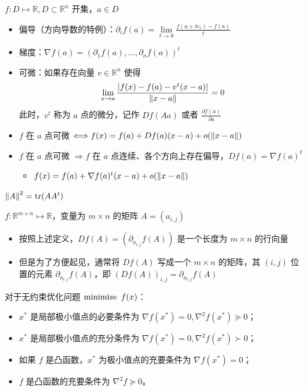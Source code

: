 \begin{remark}
    $f: D \mapsto \mathbb{R}, D \subset \mathbb{R}^n$ 开集，$a \in D$\begin{itemize}
        \item 偏导（方向导数的特例）：$\partial_if(a) = \underset{t \to 0}{\lim}\frac{f(a + te_i) - f(a)}{t}$
        \item 梯度：$\nabla f(a) = (\partial_1f(a), \dots, \partial_nf(a))^t$
        \item 可微：如果存在向量 $v \in \mathbb{R}^n$ 使得\[\lim_{x \to a}\frac{|f(x) - f(a) - v^t(x - a)|}{\norm{x - a}} = 0\]此时，$v^t$ 称为 $a$ 点的微分，记作 $Df(Aa)$ 或者 $\frac{\partial f(a)}{\partial a}$
        \item $f$ 在 $a$ 点可微 $\Longleftrightarrow f(x) = f(a) + Df(a)(x - a) + o(\norm{x - a})$
        \item $f$ 在 $a$ 点可微 $\Longrightarrow f$ 在 $a$ 点连续、各个方向上存在偏导，$Df(a) = \nabla f(a)^t$\begin{itemize}
            \item $f(x) = f(a) + \nabla f(a)^t(x - a) + o(\norm{x - a})$
        \end{itemize} 
    \end{itemize}
\end{remark}

\begin{remark}
	$\norm{A}^2 = \tr(AA^t)$
\end{remark}

\begin{remark}
    $f: \mathbb{R}^{m \times n} \mapsto \mathbb{R}$，变量为 $m \times n$ 的矩阵 $A = (a_{i, j})$\begin{itemize}
        \item 按照上述定义，$Df(A) = (\partial_{a_{i, j}}f(A))$ 是一个长度为 $m \times n$ 的行向量
        \item 但是为了方便起见，通常将 $Df(A)$ 写成一个 $m \times n$ 的矩阵，其 $(i, j)$ 位置的元素 $\partial_{a_{i, j}}f(A)$，即 $(Df(A))_{i, j} = \partial_{a_{i, j}}f(A)$
    \end{itemize}
\end{remark}

\begin{remark}
	对于无约束优化问题 $\minimize\ f(x)$：
	\begin{itemize}
		\item $x^*$ 是局部极小值点的必要条件为 $\nabla f(x^*) = 0, \nabla^2f(x^*)\succeq 0$；
		\item $x^*$ 是局部极小值点的充分条件为 $\nabla f(x^*) = 0, \nabla^2f(x^*)\succ 0$；
		\item 如果 $f$ 是凸函数，$x^*$ 为极小值点的充要条件为 $\nabla f(x^*) = 0$；
		\item $f$ 是凸函数的充要条件为 $\nabla^2f\succeq 0$。
	\end{itemize}
\end{remark}

